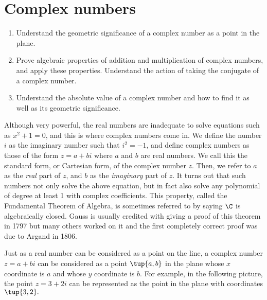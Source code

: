 \section{Complex numbers}

\begin{outcome}
  \begin{enumerate}
  \item Understand the geometric significance of a complex number as a
    point in the plane.
  \item Prove algebraic properties of addition and multiplication of
    complex numbers, and apply these properties. Understand the action
    of taking the conjugate of a complex number.
  \item Understand the absolute value of a complex number and how to
    find it as well as its geometric significance.
  \end{enumerate}
\end{outcome}

Although very powerful, the real numbers are inadequate to solve
equations such as $x^2+1=0$, and this is where complex numbers come
in. We define the number $i$ as the imaginary number such that $i^2 =
-1$, and define complex numbers as those of the form $z = a + bi$
where $a$ and $b$ are real numbers. We call this the standard form, or Cartesian form, of the complex number
$z$.
Then, we refer to $a$ as the
{\em real\em} part of $z$, and $b$ as the {\em imaginary\em} part of
$z$. It turns out that such numbers not only solve the above equation,
but in fact also solve any polynomial of degree at least 1 with complex coefficients. This property, called the Fundamental Theorem of Algebra, is sometimes referred to by saying $\C$ is
algebraically closed. Gauss is usually credited with giving a proof
of this theorem in 1797 but many others worked on it and the first
completely correct proof was due to Argand in 1806.

Just as a real number can be considered as a point on the line, a
complex number $z = a + bi$ can be considered as a point $\tup{
a,b} $ in the plane whose $x$ coordinate is $ a$ and whose $y$
coordinate is $b.$ For example, in the following picture, the point $z
= 3+2i$ can be represented as the point in the plane with
coordinates $\tup{3,2} .$

\begin{center}
\end{center}

